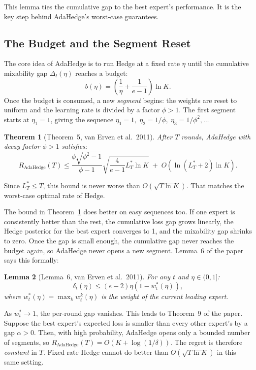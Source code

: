 \documentclass[11pt,a4paper]{article}
\newtheorem{theorem}{Theorem}
\newtheorem{lemma}[theorem]{Lemma}
\newcommand{\Lstar}{L_T^*}
\newcommand{\Rhat}{R_{\mathrm{AdaHedge}}}
\begin{document}
This lemma ties the cumulative gap to the best expert's performance. It is
the key step behind AdaHedge's worst-case guarantees.

\subsection{The Budget and the Segment Reset}

The core idea of AdaHedge is to run Hedge at a fixed rate $\eta$ until the
cumulative mixability gap $\Delta_t(\eta)$ reaches a budget:
\begin{equation}
  \label{eq:budget}
  b(\eta) = \left(\frac{1}{\eta} + \frac{1}{e-1}\right) \ln K.
\end{equation}
Once the budget is consumed, a new \emph{segment} begins: the weights are reset
to uniform and the learning rate is divided by a factor $\phi > 1$.  The first
segment starts at $\eta_1 = 1$, giving the sequence
$\eta_1 = 1,\; \eta_2 = 1/\phi,\; \eta_3 = 1/\phi^2, \ldots$

\begin{theorem}[Theorem~5, van Erven et al.\ 2011]
  \label{thm:adahedge_main}
  After $T$ rounds, AdaHedge with decay factor $\phi > 1$ satisfies:
  \[
    \Rhat(T)
      \le \frac{\phi\sqrt{\phi^2 - 1}}{\phi - 1}
            \sqrt{\frac{4}{e-1} \Lstar \ln K}
        \;+\; O\!\left(\ln(\Lstar + 2) \ln K\right).
  \]
\end{theorem}

Since $\Lstar \le T$, this bound is never worse than $O(\sqrt{T \ln K})$. That
matches the worst-case optimal rate of Hedge.

The bound in Theorem~\ref{thm:adahedge_main} does better on easy sequences too.
If one expert is consistently better than the rest, the cumulative loss gap
grows linearly, the Hedge posterior for the best expert converges to 1, and
the mixability gap shrinks to zero. Once the gap is small enough, the
cumulative gap never reaches the budget again, so AdaHedge never opens a new
segment. Lemma~6 of the paper says this formally:

\begin{lemma}[Lemma~6, van Erven et al.\ 2011]
  \label{lem:posterior}
  For any $t$ and $\eta \in (0,1]$:
  \[
    \delta_t(\eta) \le (e-2)\eta \left(1 - w_t^*(\eta)\right),
  \]
  where $w_t^*(\eta) = \max_k w_t^k(\eta)$ is the weight of the current leading expert.
\end{lemma}

As $w_t^* \to 1$, the per-round gap vanishes. This leads to Theorem~9 of the
paper. Suppose the best expert's expected loss is smaller than every other
expert's by a gap $\alpha > 0$. Then, with high probability, AdaHedge opens
only a bounded number of segments, so $\Rhat(T) = O(K + \log(1/\delta))$. The
regret is therefore \emph{constant} in $T$. Fixed-rate Hedge cannot do better
than $O(\sqrt{T \ln K})$ in this same setting.
\end{document}
